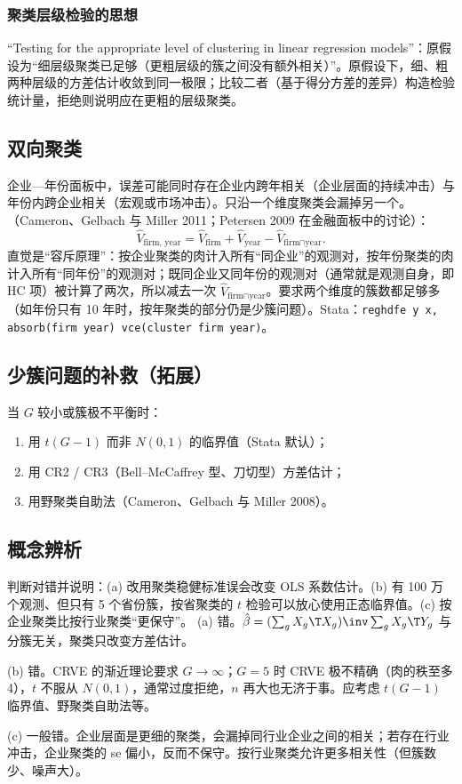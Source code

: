 \subsubsection{聚类层级检验的思想}

“Testing for the appropriate level of clustering in linear regression models”：原假设为“细层级聚类已足够（更粗层级的簇之间没有额外相关）”。原假设下，细、粗两种层级的方差估计收敛到同一极限；比较二者（基于得分方差的差异）构造检验统计量，拒绝则说明应在更粗的层级聚类。

\subsection{双向聚类}

企业—年份面板中，误差可能同时存在企业内跨年相关（企业层面的持续冲击）与年份内跨企业相关（宏观或市场冲击）。只沿一个维度聚类会漏掉另一个。（Cameron、Gelbach 与 Miller 2011；Petersen 2009 在金融面板中的讨论）：
\[
\widehat V_{\text{firm, year}}=\widehat V_{\text{firm}}+\widehat V_{\text{year}}-\widehat V_{\text{firm}\cap\text{year}} .
\]
直觉是“容斥原理”：按企业聚类的肉计入所有“同企业”的观测对，按年份聚类的肉计入所有“同年份”的观测对；既同企业又同年份的观测对（通常就是观测自身，即 HC 项）被计算了两次，所以减去一次 $\widehat V_{\text{firm}\cap\text{year}}$。要求两个维度的簇数都足够多（如年份只有 10 年时，按年聚类的部分仍是少簇问题）。Stata：\texttt{reghdfe y x, absorb(firm year) vce(cluster firm year)}。

\subsection{少簇问题的补救（拓展）}

当 $G$ 较小或簇极不平衡时：
\begin{enumerate}
\item 用 $t(G-1)$ 而非 $N(0,1)$ 的临界值（Stata 默认）；
\item 用 CR2 / CR3（Bell--McCaffrey 型、刀切型）方差估计；
\item 用野聚类自助法（Cameron、Gelbach 与 Miller 2008）。
\end{enumerate}

\subsection{概念辨析}

\begin{prac}[概念辨析：聚类]\label{pr:U05b-concept}
判断对错并说明：(a) 改用聚类稳健标准误会改变 OLS 系数估计。(b) 有 100 万个观测、但只有 5 个省份簇，按省聚类的 $t$ 检验可以放心使用正态临界值。(c) 按企业聚类比按行业聚类“更保守”。
\answer
(a) 错。$\hat\beta=(\sum_gX_g\T X_g)\inv\sum_gX_g\T Y_g$ 与分簇无关，聚类只改变方差估计。

(b) 错。CRVE 的渐近理论要求 $G\to\infty$；$G=5$ 时 CRVE 极不精确（肉的秩至多 4），$t$ 不服从 $N(0,1)$，通常过度拒绝，$n$ 再大也无济于事。应考虑 $t(G-1)$ 临界值、野聚类自助法等。

(c) 一般错。企业层面是更细的聚类，会漏掉同行业企业之间的相关；若存在行业冲击，企业聚类的 se 偏小，反而不保守。按行业聚类允许更多相关性（但簇数少、噪声大）。
\end{prac}

